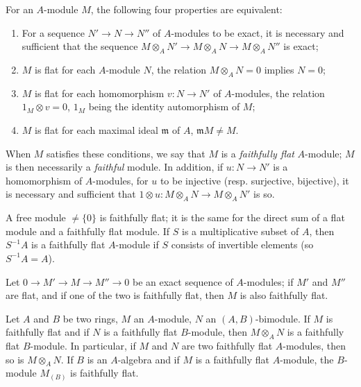 \begin{env}[6.4.1]
\label{0.6.4.1}
For an $A$-module $M$, the following four properties are equivalent:
\begin{enumerate}[label=(\alph*)]
  \item For a sequence $N'\to N\to N''$ of $A$-modules to be exact, it is necessary and
    sufficient that the sequence $M\otimes_A N'\to M\otimes_A N\to M\otimes_A N''$ is exact;
  \item $M$ is flat for each $A$-module $N$, the relation $M\otimes_A N=0$ implies $N=0$;
  \item $M$ is flat for each homomorphism $v:N\to N'$ of $A$-modules, the relation
    $1_M\otimes v=0$, $1_M$ being the identity automorphism of $M$;
  \item $M$ is flat for each maximal ideal $\mathfrak{m}$ of $A$, $\mathfrak{m}M\neq M$.
\end{enumerate}

When $M$ satisfies these conditions, we say that $M$ is a {\em faithfully flat} $A$-module;
$M$ is then necessarily a {\em faithful} module. In addition, if $u:N\to N'$ is a
homomorphism of $A$-modules, for $u$ to be injective (resp. surjective, bijective), it is
necessary and sufficient that $1\otimes u:M\otimes_A N\to M\otimes_A N'$ is so.
\end{env}

\begin{env}[6.4.2]
\label{0.6.4.2}
A free module $\neq\{0\}$ is faithfully flat; it is the same for the direct sum of a flat
module and a faithfully flat module. If $S$ is a multiplicative subset of $A$, then
$S^{-1}A$ is a faithfully flat $A$-module if $S$ consists of invertible elements
(so $S^{-1}A=A$).
\end{env}

\begin{env}[6.4.3]
\label{0.6.4.3}
Let $0\to M'\to M\to M''\to 0$ be an exact sequence of $A$-modules; if $M'$ and $M''$ are
flat, and if one of the two is faithfully flat, then $M$ is also faithfully flat.
\end{env}

\begin{env}[6.4.4]
\label{0.6.4.4}
Let $A$ and $B$ be two rings, $M$ an $A$-module, $N$ an $(A,B)$-bimodule. If $M$ is
faithfully flat and if $N$ is a faithfully flat $B$-module, then $M\otimes_A N$ is a
faithfully flat $B$-module. In particular, if $M$ and $N$ are two faithfully flat
$A$-modules, then so is $M\otimes_A N$. If $B$ is an $A$-algebra and if $M$ is a faithfully
flat $A$-module, the $B$-module $M_{(B)}$ is faithfully flat.
\end{env}

